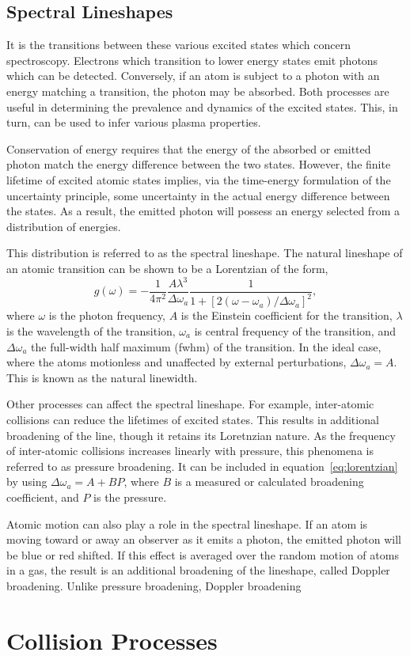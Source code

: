 \subsection{Spectral Lineshapes}

It is the transitions between these various excited states which concern
spectroscopy. Electrons which transition to lower energy states emit photons
which can be detected. Conversely, if an atom is subject to a photon with an
energy matching a transition, the photon may be absorbed. Both processes are
useful in determining the prevalence and dynamics of the excited states. This,
in turn, can be used to infer various plasma properties.

Conservation of energy requires that the energy of the absorbed or emitted
photon match the energy difference between the two states. However, the finite
lifetime of excited atomic states implies, via the time-energy formulation of
the uncertainty principle, some uncertainty in the actual energy difference
between the states. As a result, the emitted photon will possess an energy
selected from a distribution of energies.

This distribution is referred to as the spectral lineshape. The natural
lineshape of an atomic transition can be shown \cite{Siegman1986} to be a
Lorentzian of the form,
\begin{equation}
  g(\omega) = -\frac{1}{4\pi^2}\frac{A\lambda^3}{\Delta\omega_a}
  \frac{1}{1 + \left[2(\omega-\omega_a)/\Delta\omega_a\right]^2},
  \label{eq:lorentzian}
\end{equation}
where $\omega$ is the photon frequency, $A$ is the Einstein coefficient for the
transition, $\lambda$ is the wavelength of the transition, $\omega_a$ is central
frequency of the transition, and $\Delta\omega_a$ the full-width half maximum
(\acs{fwhm}) of the transition. In the ideal case, where the atoms motionless
and unaffected by external perturbations, $\Delta\omega_a = A$. This is known as
the natural linewidth.

Other processes can affect the spectral lineshape. For example, inter-atomic
collisions can reduce the lifetimes of excited states. This results in
additional broadening of the line, though it retains its Loretnzian nature. As
the frequency of inter-atomic collisions increases linearly with pressure, this
phenomena is referred to as pressure broadening. It can be included in
equation~\ref{eq:lorentzian} by using $\Delta\omega_a = A + BP$, where $B$ is a
measured or calculated broadening coefficient, and $P$ is the pressure.

Atomic motion can also play a role in the spectral lineshape. If an atom is
moving toward or away an observer as it emits a photon, the emitted photon will
be blue or red shifted. If this effect is averaged over the random motion of
atoms in a gas, the result is an additional broadening of the lineshape, called
Doppler broadening. Unlike pressure broadening, Doppler broadening

\section{Collision Processes}
